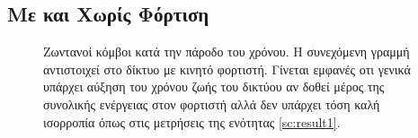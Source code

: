 \subsection{Με και Χωρίς Φόρτιση}\label{subc:result6_1}
\begin{figure}[H]
  \centering
  \caption{Ζωντανοί κόμβοι κατά την πάροδο του χρόνου. Η συνεχόμενη γραμμή αντιστοιχεί στο δίκτυο με κινητό φορτιστή. Γίνεται εμφανές οτι γενικά υπάρχει αύξηση
	του χρόνου ζωής του δικτύου αν δοθεί μέρος της συνολικής ενέργειας στον φορτιστή αλλά δεν υπάρχει τόση καλή ισορροπία όπως στις μετρήσεις της ενότητας
\ref{sc:result1}.}
  \label{fig:5_1exp_1_1}
\end{figure}



